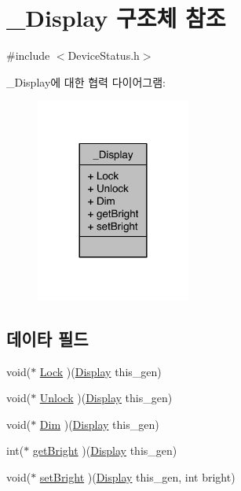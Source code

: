 \hypertarget{struct___display}{\section{\-\_\-\-Display 구조체 참조}
\label{struct___display}
}


{\ttfamily \#include $<$Device\-Status.\-h$>$}



\-\_\-\-Display에 대한 협력 다이어그램\-:\nopagebreak
\begin{figure}[H]
\begin{center}
\leavevmode
\includegraphics[width=144pt]{d4/db6/struct___display__coll__graph}
\end{center}
\end{figure}
\subsection*{데이타 필드}
\begin{DoxyCompactItemize}
\item 
void($\ast$ \hyperlink{struct___display_a8ebb33d01cded0db9f4bcdbcf44e90d0}{Lock} )(\hyperlink{namespace_3global_scope_4_d4/d3c/struct_display}{Display} this\-\_\-gen)
\item 
void($\ast$ \hyperlink{struct___display_a2997a5ca8fcbf98731edc07b55919203}{Unlock} )(\hyperlink{namespace_3global_scope_4_d4/d3c/struct_display}{Display} this\-\_\-gen)
\item 
void($\ast$ \hyperlink{struct___display_afe07206478960f03a500e7fc2b710446}{Dim} )(\hyperlink{namespace_3global_scope_4_d4/d3c/struct_display}{Display} this\-\_\-gen)
\item 
int($\ast$ \hyperlink{struct___display_a61cbbbd330281072786ca6289de92a3a}{get\-Bright} )(\hyperlink{namespace_3global_scope_4_d4/d3c/struct_display}{Display} this\-\_\-gen)
\item 
void($\ast$ \hyperlink{struct___display_acb57f785b1df759aa711224a445c004f}{set\-Bright} )(\hyperlink{namespace_3global_scope_4_d4/d3c/struct_display}{Display} this\-\_\-gen, int bright)
\end{DoxyCompactItemize}


